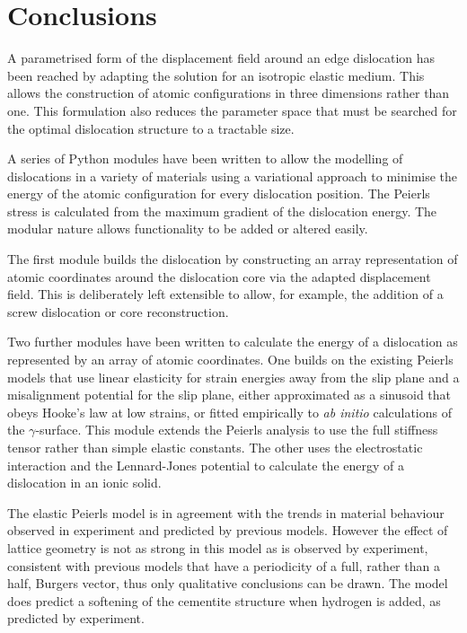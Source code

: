 \section{Conclusions}

A parametrised form of the displacement field around an edge dislocation has been reached by adapting the solution for an isotropic elastic medium. This allows the construction of atomic configurations in three dimensions rather than one. This formulation also reduces the parameter space that must be searched for the optimal dislocation structure to a tractable size.

A series of Python modules have been written to allow the modelling of dislocations in a variety of materials using a variational approach to minimise the energy of the atomic configuration for every dislocation position. The Peierls stress is calculated from the maximum gradient of the dislocation energy. The modular nature allows functionality to be added or altered easily. 

The first module builds the dislocation by constructing an array representation of atomic coordinates around the dislocation core via the adapted displacement field. This is deliberately left extensible to allow, for example, the addition of a screw dislocation or core reconstruction.

Two further modules have been written to calculate the energy of a dislocation as represented by an array of atomic coordinates. One builds on the existing Peierls models that use linear elasticity for strain energies away from the slip plane and a misalignment potential for the slip plane, either approximated as a sinusoid that obeys Hooke's law at low strains, or fitted empirically to \emph{ab initio} calculations of the $\gamma$-surface. This module extends the Peierls analysis to use the full stiffness tensor rather than simple elastic constants. The other uses the electrostatic interaction and the Lennard-Jones potential to calculate the energy of a dislocation in an ionic solid.

The elastic Peierls model is in agreement with the trends in material behaviour observed in experiment and predicted by previous models. However the effect of lattice geometry is not as strong in this model as is observed by experiment, consistent with previous models that have a periodicity of a full, rather than a half,  Burgers vector, thus only qualitative conclusions can be drawn. The model does predict a softening of the cementite structure when hydrogen is added, as predicted by experiment.


